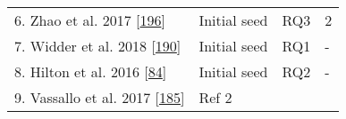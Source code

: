 \documentclass[]{book}
\begin{document}
\begin{longtable}[]{@{}llll@{}}
\begin{minipage}[t]{0.48\columnwidth}\raggedright\strut
6. Zhao et al. 2017
{[}\protect\hyperlink{ref-zhao2017impact}{196}{]}\strut
\end{minipage} & \begin{minipage}[t]{0.20\columnwidth}\raggedright\strut
Initial seed\strut
\end{minipage} & \begin{minipage}[t]{0.14\columnwidth}\raggedright\strut
RQ3\strut
\end{minipage} & \begin{minipage}[t]{0.06\columnwidth}\raggedright\strut
2\strut
\end{minipage}\tabularnewline
\begin{minipage}[t]{0.48\columnwidth}\raggedright\strut
7. Widder et al. 2018
{[}\protect\hyperlink{ref-widder2018m}{190}{]}\strut
\end{minipage} & \begin{minipage}[t]{0.20\columnwidth}\raggedright\strut
Initial seed\strut
\end{minipage} & \begin{minipage}[t]{0.14\columnwidth}\raggedright\strut
RQ1\strut
\end{minipage} & \begin{minipage}[t]{0.06\columnwidth}\raggedright\strut
-\strut
\end{minipage}\tabularnewline
\begin{minipage}[t]{0.48\columnwidth}\raggedright\strut
8. Hilton et al. 2016
{[}\protect\hyperlink{ref-hilton2016usage}{84}{]}\strut
\end{minipage} & \begin{minipage}[t]{0.20\columnwidth}\raggedright\strut
Initial seed\strut
\end{minipage} & \begin{minipage}[t]{0.14\columnwidth}\raggedright\strut
RQ2\strut
\end{minipage} & \begin{minipage}[t]{0.06\columnwidth}\raggedright\strut
-\strut
\end{minipage}\tabularnewline
\begin{minipage}[t]{0.48\columnwidth}\raggedright\strut
9. Vassallo et al. 2017
{[}\protect\hyperlink{ref-vassallo2017tale}{185}{]}\strut
\end{minipage} & \begin{minipage}[t]{0.20\columnwidth}\raggedright\strut
Ref 2\strut
\end{minipage} & \begin{minipage}[t]{0.14\columnwidth}\raggedright\strut

\end{minipage}
\end{longtable}
\end{document}
